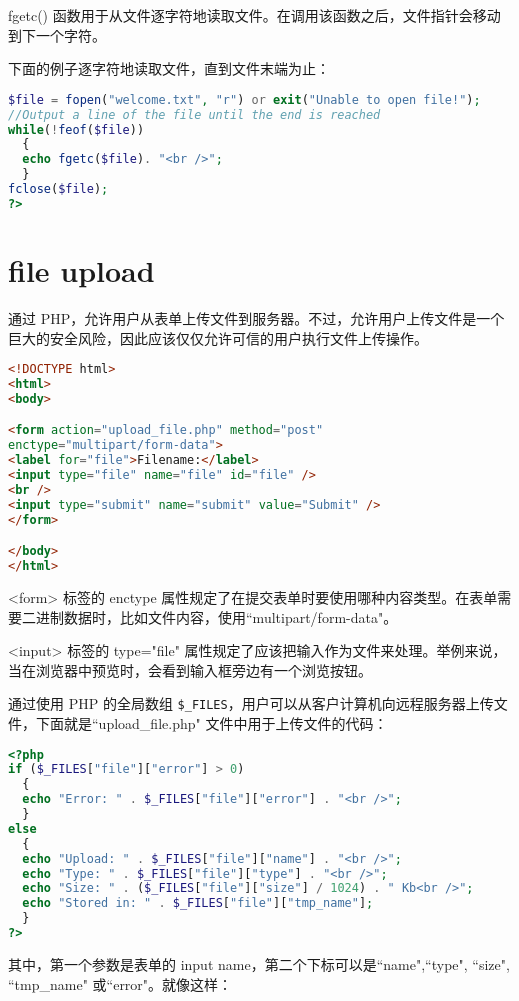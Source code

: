 fgetc() 函数用于从文件逐字符地读取文件。在调用该函数之后，文件指针会移动到下一个字符。

下面的例子逐字符地读取文件，直到文件末端为止：

\begin{lstlisting}[language=PHP]
$file = fopen("welcome.txt", "r") or exit("Unable to open file!");
//Output a line of the file until the end is reached
while(!feof($file))
  {
  echo fgetc($file). "<br />";
  }
fclose($file);
?>
\end{lstlisting}


\section{f\/ile upload}

通过 PHP，允许用户从表单上传文件到服务器。不过，允许用户上传文件是一个巨大的安全风险，因此应该仅仅允许可信的用户执行文件上传操作。

\begin{lstlisting}[language=HTML]
<!DOCTYPE html>
<html>
<body>

<form action="upload_file.php" method="post"
enctype="multipart/form-data">
<label for="file">Filename:</label>
<input type="file" name="file" id="file" /> 
<br />
<input type="submit" name="submit" value="Submit" />
</form>

</body>
</html>
\end{lstlisting}

<form> 标签的 enctype 属性规定了在提交表单时要使用哪种内容类型。在表单需要二进制数据时，比如文件内容，使用``multipart/form-data"。

<input> 标签的 type="file" 属性规定了应该把输入作为文件来处理。举例来说，当在浏览器中预览时，会看到输入框旁边有一个浏览按钮。

通过使用 PHP 的全局数组 \texttt{\$\_FILES}，用户可以从客户计算机向远程服务器上传文件，下面就是``upload\_file.php" 文件中用于上传文件的代码：



\begin{lstlisting}[language=PHP]
<?php
if ($_FILES["file"]["error"] > 0)
  {
  echo "Error: " . $_FILES["file"]["error"] . "<br />";
  }
else
  {
  echo "Upload: " . $_FILES["file"]["name"] . "<br />";
  echo "Type: " . $_FILES["file"]["type"] . "<br />";
  echo "Size: " . ($_FILES["file"]["size"] / 1024) . " Kb<br />";
  echo "Stored in: " . $_FILES["file"]["tmp_name"];
  }
?>
\end{lstlisting}

其中，第一个参数是表单的 input name，第二个下标可以是``name",``type", ``size", ``tmp\_name" 或``error"。就像这样：

